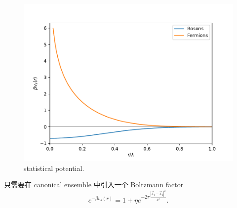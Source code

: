 \begin{itemize}
	\begin{figure}[H]
		\centering
		\includegraphics[scale=0.5]{figures/statistical potential.pdf}
		\caption{statistical potential.}
	\end{figure}
	
	\begin{tcolorbox}[title=proof:]
		只需要在 canonical ensemble 中引入一个 Boltzmann factor
		\begin{equation}
			e^{- \beta v_s(r)} = 1 + \eta e^{- 2 \pi \frac{|\vec{x}_1 - \vec{x}_2|^2}{\lambda^2}}.
		\end{equation}
	\end{tcolorbox}
\end{itemize}

